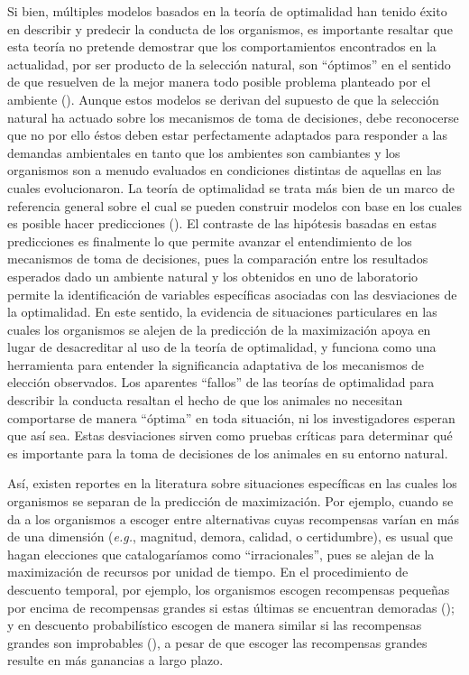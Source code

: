 \documentclass[a4paper,12pt]{article}
\begin{document}
Si bien, múltiples modelos basados en la teoría de optimalidad han tenido éxito en describir y predecir la conducta de los organismos, es importante resaltar que esta teoría no pretende demostrar que los comportamientos encontrados en la actualidad, por ser producto de la selección natural, son ``óptimos'' en el sentido de que resuelven de la mejor manera todo posible problema planteado por el ambiente (\cite{Parker1990}).
Aunque estos modelos se derivan del supuesto de que la selección natural ha actuado sobre los mecanismos de toma de decisiones, debe reconocerse que no por ello éstos deben estar perfectamente adaptados para responder a las demandas ambientales en tanto que los ambientes son cambiantes y los organismos son a menudo evaluados en condiciones distintas de aquellas en las cuales evolucionaron.
La teoría de optimalidad se trata más bien de un marco de referencia general sobre el cual se pueden construir modelos con base en los cuales es posible hacer predicciones (\cite{Vasconcelos2015}).
El contraste de las hipótesis basadas en estas predicciones es finalmente lo que permite avanzar el entendimiento de los mecanismos de toma de decisiones, pues la comparación entre los resultados esperados dado un ambiente natural y los obtenidos en uno de laboratorio permite la identificación de variables específicas asociadas con las desviaciones de la optimalidad.
En este sentido, la evidencia de situaciones particulares en las cuales los organismos se alejen de la predicción de la maximización apoya en lugar de desacreditar al uso de la teoría de optimalidad, y funciona como una herramienta para entender la significancia adaptativa de los mecanismos de elección observados.
Los aparentes ``fallos'' de las teorías de optimalidad para describir la conducta resaltan el hecho de que los animales no necesitan comportarse de manera ``óptima'' en toda situación, ni los investigadores esperan que así sea.
Estas desviaciones sirven como pruebas críticas para determinar qué es importante para la toma de decisiones de los animales en su entorno natural.

Así, existen reportes en la literatura sobre situaciones específicas en las cuales los organismos se separan de la predicción de maximización.
Por ejemplo, cuando se da a los organismos a escoger entre alternativas cuyas recompensas varían en más de una dimensión ({\itshape e.g.}, magnitud, demora, calidad, o certidumbre), es usual que hagan elecciones que catalogaríamos como ``irracionales'', pues se alejan de la maximización de recursos por unidad de tiempo.
En el procedimiento de descuento temporal, por ejemplo, los organismos escogen recompensas pequeñas por encima de recompensas grandes si estas últimas se encuentran demoradas (\cite{Vanderveldt2016}); y en descuento probabilístico escogen de manera similar si las recompensas grandes son improbables (\cite{Green2014}), a pesar de que escoger las recompensas grandes resulte en más ganancias a largo plazo.
\end{document}
